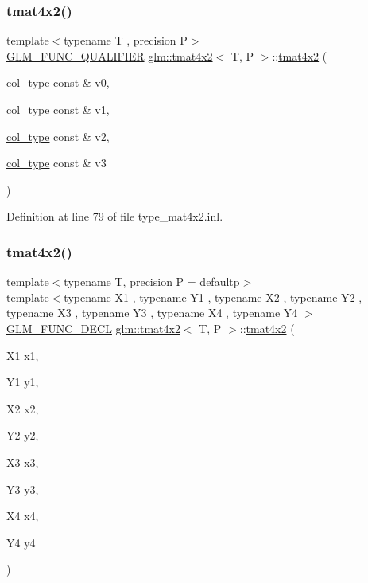 \subsubsection{\texorpdfstring{tmat4x2()}{tmat4x2()}\hspace{0.1cm}{\footnotesize\ttfamily [7/22]}}
{\footnotesize\ttfamily template$<$typename T , precision P$>$ \\
\mbox{\hyperlink{setup_8hpp_a33fdea6f91c5f834105f7415e2a64407}{G\+L\+M\+\_\+\+F\+U\+N\+C\+\_\+\+Q\+U\+A\+L\+I\+F\+I\+ER}} \mbox{\hyperlink{structglm_1_1tmat4x2}{glm\+::tmat4x2}}$<$ T, P $>$\+::\mbox{\hyperlink{structglm_1_1tmat4x2}{tmat4x2}} (\begin{DoxyParamCaption}\item[{\mbox{\hyperlink{structglm_1_1tmat4x2_ac775231a890f4ea29cd0073670309b3a}{col\+\_\+type}} const \&}]{v0,  }\item[{\mbox{\hyperlink{structglm_1_1tmat4x2_ac775231a890f4ea29cd0073670309b3a}{col\+\_\+type}} const \&}]{v1,  }\item[{\mbox{\hyperlink{structglm_1_1tmat4x2_ac775231a890f4ea29cd0073670309b3a}{col\+\_\+type}} const \&}]{v2,  }\item[{\mbox{\hyperlink{structglm_1_1tmat4x2_ac775231a890f4ea29cd0073670309b3a}{col\+\_\+type}} const \&}]{v3 }\end{DoxyParamCaption})}



Definition at line 79 of file type\+\_\+mat4x2.\+inl.

\mbox{\label{structglm_1_1tmat4x2_a1f10ec226d91b1b7d78aaf5c6c10b34b}} 
\subsubsection{\texorpdfstring{tmat4x2()}{tmat4x2()}\hspace{0.1cm}{\footnotesize\ttfamily [8/22]}}
{\footnotesize\ttfamily template$<$typename T, precision P = defaultp$>$ \\
template$<$typename X1 , typename Y1 , typename X2 , typename Y2 , typename X3 , typename Y3 , typename X4 , typename Y4 $>$ \\
\mbox{\hyperlink{setup_8hpp_ab2d052de21a70539923e9bcbf6e83a51}{G\+L\+M\+\_\+\+F\+U\+N\+C\+\_\+\+D\+E\+CL}} \mbox{\hyperlink{structglm_1_1tmat4x2}{glm\+::tmat4x2}}$<$ T, P $>$\+::\mbox{\hyperlink{structglm_1_1tmat4x2}{tmat4x2}} (\begin{DoxyParamCaption}\item[{X1}]{x1,  }\item[{Y1}]{y1,  }\item[{X2}]{x2,  }\item[{Y2}]{y2,  }\item[{X3}]{x3,  }\item[{Y3}]{y3,  }\item[{X4}]{x4,  }\item[{Y4}]{y4 }\end{DoxyParamCaption})}

